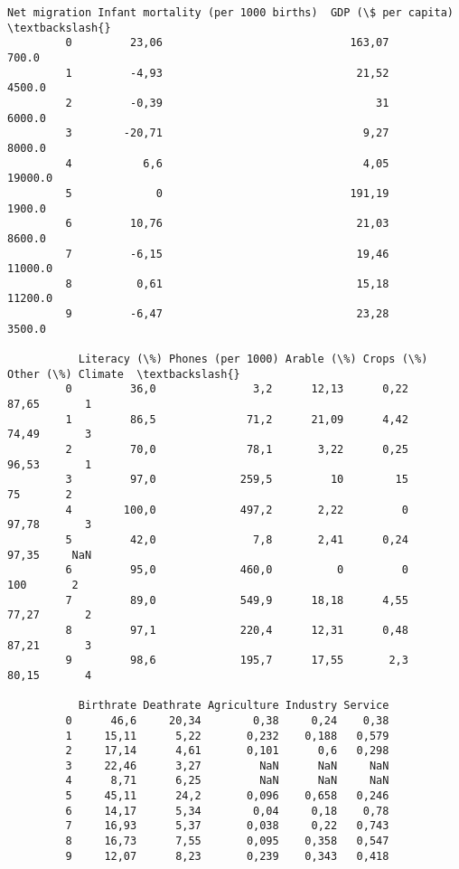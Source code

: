 \documentclass[11pt]{article}
\begin{document}
\begin{Verbatim}[commandchars=\\\{\}]
           Net migration Infant mortality (per 1000 births)  GDP (\$ per capita)  \textbackslash{}
         0         23,06                             163,07               700.0   
         1         -4,93                              21,52              4500.0   
         2         -0,39                                 31              6000.0   
         3        -20,71                               9,27              8000.0   
         4           6,6                               4,05             19000.0   
         5             0                             191,19              1900.0   
         6         10,76                              21,03              8600.0   
         7         -6,15                              19,46             11000.0   
         8          0,61                              15,18             11200.0   
         9         -6,47                              23,28              3500.0   
         
           Literacy (\%) Phones (per 1000) Arable (\%) Crops (\%) Other (\%) Climate  \textbackslash{}
         0         36,0               3,2      12,13      0,22     87,65       1   
         1         86,5              71,2      21,09      4,42     74,49       3   
         2         70,0              78,1       3,22      0,25     96,53       1   
         3         97,0             259,5         10        15        75       2   
         4        100,0             497,2       2,22         0     97,78       3   
         5         42,0               7,8       2,41      0,24     97,35     NaN   
         6         95,0             460,0          0         0       100       2   
         7         89,0             549,9      18,18      4,55     77,27       2   
         8         97,1             220,4      12,31      0,48     87,21       3   
         9         98,6             195,7      17,55       2,3     80,15       4   
         
           Birthrate Deathrate Agriculture Industry Service  
         0      46,6     20,34        0,38     0,24    0,38  
         1     15,11      5,22       0,232    0,188   0,579  
         2     17,14      4,61       0,101      0,6   0,298  
         3     22,46      3,27         NaN      NaN     NaN  
         4      8,71      6,25         NaN      NaN     NaN  
         5     45,11      24,2       0,096    0,658   0,246  
         6     14,17      5,34        0,04     0,18    0,78  
         7     16,93      5,37       0,038     0,22   0,743  
         8     16,73      7,55       0,095    0,358   0,547  
         9     12,07      8,23       0,239    0,343   0,418  
\end{Verbatim}
            
\end{document}
